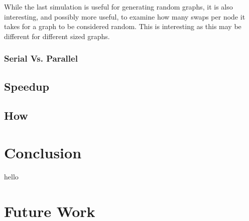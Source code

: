 \documentclass[pdftex,12pt,a4paper]{article}
\begin{document}
While the last simulation is useful for generating random graphs, it is also interesting, and possibly more useful, to examine how many swaps per node it takes for a graph to be considered random. This is interesting as this may be different for different sized graphs.

\subsubsection{Serial Vs. Parallel}

\subsection{Speedup}

\subsection{How}

\newpage

\section{Conclusion}

hello

\newpage

\section{Future Work}
\end{document}

